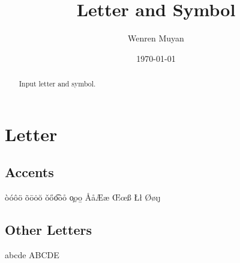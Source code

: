 \documentclass{article}
\title{Letter and Symbol}
\author{Wenren Muyan}
\date{\today}
\begin{document}
    \maketitle

    \begin{abstract}
        Input letter and symbol. 
    \end{abstract}

    \tableofcontents

    \section{Letter}
        \subsection{Accents}
            \`o\phantom{50}\'o\phantom{50}\^o\phantom{50}\"o\newline
            \~o\phantom{50}\=o\phantom{50}\.o\phantom{50}\u{o}\newline
            \v{o}\phantom{50}\H{o}\phantom{50}\t{oo}\phantom{50}\r{o}\newline
            \c{o}\phantom{50}\d{o}\phantom{50}\b{o}\newline
            \AA\phantom{50}\aa\phantom{50}\AE\phantom{50}\ae\newline
            \OE\phantom{50}\oe\phantom{50}\SS\phantom{50}\ss\newline
            \IJ\phantom{50}\ij\phantom{50}\L\phantom{50}\l\newline
            \O\phantom{50}\o\phantom{50}\i\phantom{50}\j

        \subsection{Other Letters}
            \textgreek{abcde}\newline                   %
            {\selectfont ABCDE}       %
\end{document}
